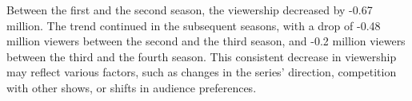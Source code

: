 \documentclass[
  letterpaper,
  DIV=11,
  numbers=noendperiod]{scrartcl}
\begin{document}
Between the first and the second season, the viewership decreased by
-0.67 million. The trend continued in the subsequent seasons, with a
drop of -0.48 million viewers between the second and the third season,
and -0.2 million viewers between the third and the fourth season. This
consistent decrease in viewership may reflect various factors, such as
changes in the series' direction, competition with other shows, or
shifts in audience preferences.
\end{document}
